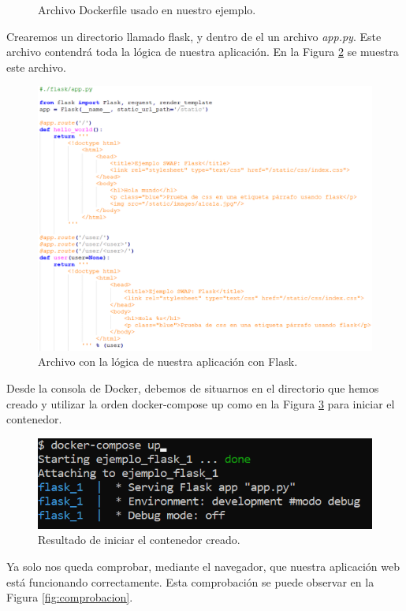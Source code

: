 \documentclass[11pt,a4paper]{article}
\begin{document}
\begin{itemize}
\begin{figure}[H]
    	\caption[Dockerfile]{Archivo Dockerfile usado en nuestro ejemplo.}
    	\label{fig:E3_dockerfile}
    \end{figure}
\end{itemize} 
Crearemos un directorio llamado flask, y dentro de el un archivo \emph{app.py}. Este archivo contendrá toda la lógica de nuestra aplicación. En la Figura \ref{fig:E3_app} se muestra este archivo. 
\begin{figure}[H]
	\centering
	\includegraphics[scale=0.5]{images/E3_app.PNG}
	\caption[app.py]{Archivo con la lógica de nuestra aplicación con Flask.}
	\label{fig:E3_app}
\end{figure}
Desde la consola de Docker, debemos de situarnos en el directorio que hemos creado y utilizar la orden
docker-compose up como en la Figura \ref{fig:E3_docker-up} para iniciar el contenedor.
\begin{figure}[H]
	\centering
	\includegraphics[scale=0.5]{images/E3_docker-up.PNG}
	\caption[docker-compose]{Resultado de iniciar el contenedor creado.}
	\label{fig:E3_docker-up}
\end{figure}
Ya solo nos queda comprobar, mediante el navegador, que nuestra aplicación web está funcionando correctamente. Esta comprobación se puede observar en la Figura \ref{fig:comprobacion}.
\end{document}
